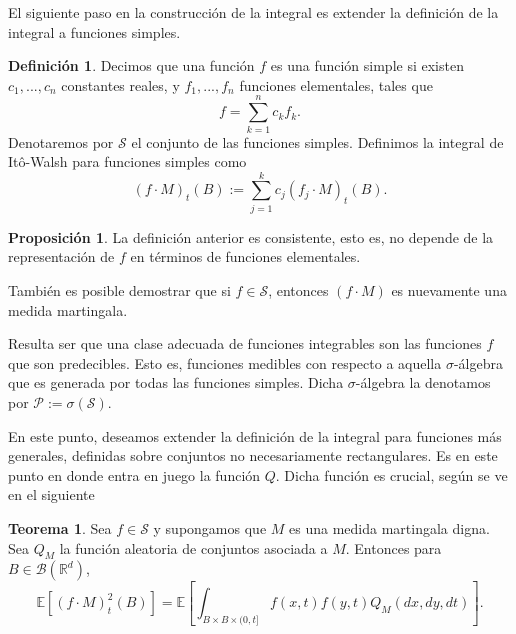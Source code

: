 \documentclass[letterpaper,twoside,12pt]{book}
\newcommand{\R}{\mathbb{R}}
\newcommand{\B}{\mathcal{B}}
\newcommand{\E}{\mathbb{E}}
\newcommand{\1}{\mathds{1}}
\theoremstyle{definition}
\newtheorem{dfn}{Definición}
\theoremstyle{definition}
\newtheorem{teo}{Teorema}
\theoremstyle{remark}
\theoremstyle{definition}
\theoremstyle{definition}
\newtheorem{prop}{Proposición}
\theoremstyle{definition}
\theoremstyle{definition}
\theoremstyle{definition}
\begin{document}
El siguiente paso en la construcción de la integral es extender la definición de la integral a funciones simples. 

\begin{dfn} 
   Decimos que una función $f$ es una función simple si existen $c_1,...,c_n$ constantes reales, y $f_1,...,f_n$ funciones elementales, tales que 
   \[
     f=\sum_{k=1}^{n}c_kf_k.  
   \] Denotaremos por $\mathscr{S}$ el conjunto de las funciones simples. Definimos la integral de Itô-Walsh para funciones simples como 
   \[
   (f\cdot M)_t(B):=\sum_{j=1}^{k}c_j(f_j\cdot M)_t(B).
   \]
 \end{dfn}
 \begin{prop} 
  La definición anterior es consistente, esto es, no depende de la representación de $f$ en términos de funciones elementales.
  \end{prop}
También es posible demostrar que si $f\in \mathscr{S}$, entonces $(f\cdot M)$ es nuevamente una medida martingala. 

Resulta ser que una clase adecuada de funciones integrables son las funciones $f$ que son predecibles. Esto es, funciones medibles con respecto a aquella $\sigma$-álgebra que es generada por todas las funciones simples. Dicha $\sigma$-álgebra la denotamos por $\mathscr{P}:=\sigma(\mathscr{S})$.

En este punto, deseamos extender la definición de la integral para funciones más generales, definidas sobre conjuntos no necesariamente rectangulares. Es en este punto en donde entra en juego la función $Q$.  Dicha función es crucial, según se ve en el siguiente 

\begin{teo}\label{rolmedidaq}
Sea $f\in \mathscr{S}$ y supongamos que $M$ es una medida martingala digna. Sea $Q_M$ la función aleatoria de conjuntos asociada a $M$. Entonces para $B\in \B(\R^{d})$,
\[
\E\left[(f\cdot M)_t^2(B)\right]=\E\left[\int_{B\times B\times (0,t]}f(x,t)f(y,t)Q_M(dx,dy,dt)\right].   
\]
\end{teo}
\end{document}
